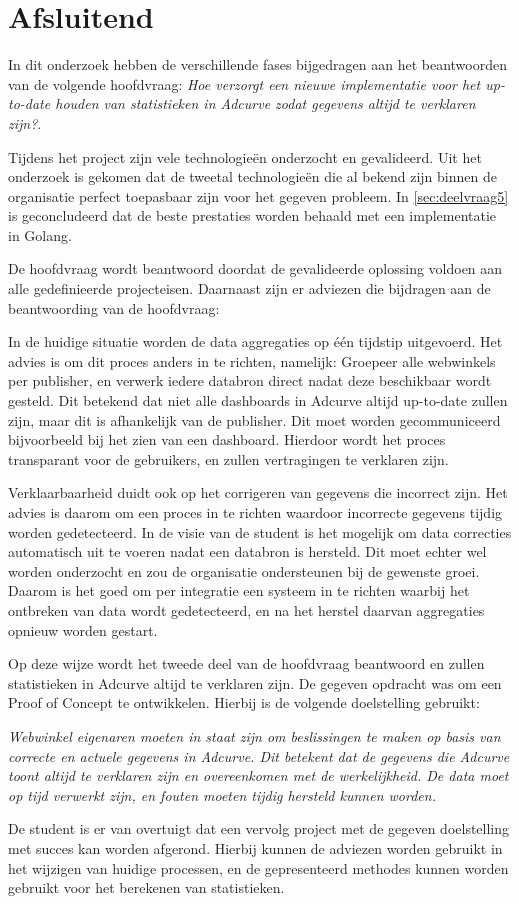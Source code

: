 \chapter{Afsluitend}
\label{ch:afsluitend}

In dit onderzoek hebben de verschillende fases bijgedragen aan het beantwoorden van de volgende hoofdvraag: \textit{Hoe verzorgt een nieuwe implementatie voor het up-to-date houden van statistieken in Adcurve zodat gegevens altijd te verklaren zijn?}.

Tijdens het project zijn vele technologieën onderzocht en gevalideerd. Uit het onderzoek is gekomen dat de tweetal technologieën die al bekend zijn binnen de organisatie perfect toepasbaar zijn voor het gegeven probleem. In \ref{sec:deelvraag5} is geconcludeerd dat de beste prestaties worden behaald met een implementatie in Golang.

De hoofdvraag wordt beantwoord doordat de gevalideerde oplossing voldoen aan alle gedefinieerde projecteisen. Daarnaast zijn er adviezen die bijdragen aan de beantwoording van de hoofdvraag:

In de huidige situatie worden de data aggregaties op één tijdstip uitgevoerd. Het advies is om dit proces anders in te richten, namelijk:
Groepeer alle webwinkels per publisher, en verwerk iedere databron direct nadat deze beschikbaar wordt gesteld. Dit betekend dat niet alle dashboards in Adcurve altijd up-to-date zullen zijn, maar dit is afhankelijk van de publisher. Dit moet worden gecommuniceerd bijvoorbeeld bij het zien van een dashboard. Hierdoor wordt het proces transparant voor de gebruikers, en zullen vertragingen te verklaren zijn.

Verklaarbaarheid duidt ook op het corrigeren van gegevens die incorrect zijn. Het advies is daarom om een proces in te richten waardoor incorrecte gegevens tijdig worden gedetecteerd. In de visie van de student is het mogelijk om data correcties automatisch uit te voeren nadat een databron is hersteld. Dit moet echter wel worden onderzocht en zou de organisatie ondersteunen bij de gewenste groei. Daarom is het goed om per integratie een systeem in te richten waarbij het ontbreken van data wordt gedetecteerd, en na het herstel daarvan aggregaties opnieuw worden gestart. 

Op deze wijze wordt het tweede deel van de hoofdvraag beantwoord en zullen statistieken in Adcurve altijd te verklaren zijn. De gegeven opdracht was om een Proof of Concept te ontwikkelen. Hierbij is de volgende doelstelling gebruikt:

\textit{Webwinkel eigenaren moeten in staat zijn om beslissingen te maken op basis van correcte en actuele gegevens in Adcurve. Dit betekent dat de gegevens die Adcurve toont altijd te verklaren zijn en overeenkomen met de werkelijkheid. De data moet op tijd verwerkt zijn, en fouten moeten tijdig hersteld kunnen worden.}

De student is er van overtuigt dat een vervolg project met de gegeven doelstelling met succes kan worden afgerond. Hierbij kunnen de adviezen worden gebruikt in het wijzigen van huidige processen, en de gepresenteerd methodes kunnen worden gebruikt voor het berekenen van statistieken.
